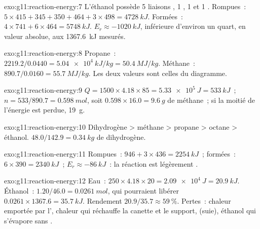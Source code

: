 \begin{solution}{exo:g11:reaction-energy:7}
L'éthanol  possède 5 liaisons , 1 ,
1  et 1 . Rompues~: $5 \times 415 + 345 + 350 + 464 + 3 \times 498 =
\qty{4728}{kJ}$. Formées~: $4 \times 741 + 6 \times 464 = \qty{5748}{kJ}$.
$E_r \approx \qty{-1020}{kJ}$, inférieure d'environ un quart, en valeur
absolue, aux \qty{1367.6}{kJ} mesurés.
\end{solution}

\begin{solution}{exo:g11:reaction-energy:8}
Propane~: $2219.2 / 0.0440 = \qty{5.04e4}{kJ/kg} = \qty{50.4}{MJ/kg}$.
Méthane~: $890.7 / 0.0160 = \qty{55.7}{MJ/kg}$. Les deux valeurs sont
celles du diagramme.
\end{solution}

\begin{solution}{exo:g11:reaction-energy:9}
$Q = 1500 \times 4.18 \times 85 = \qty{5.33e5}{J} = \qty{533}{kJ}$~;
$n = 533 / 890.7 = \qty{0.598}{mol}$, soit $0.598 \times 16.0 =
\qty{9.6}{g}$ de méthane~; si la moitié de l'énergie est perdue,
\qty{19}{g}.
\end{solution}

\begin{solution}{exo:g11:reaction-energy:10}
Dihydrogène > méthane > propane > octane > éthanol.
$48.0 / 142.9 = \qty{0.34}{kg}$ de dihydrogène.
\end{solution}

\begin{solution}{exo:g11:reaction-energy:11}
Rompues~: $946 + 3 \times 436 = \qty{2254}{kJ}$~; formées~:
$6 \times 390 = \qty{2340}{kJ}$~; $E_r \approx \qty{-86}{kJ}$~: la
réaction est légèrement .
\end{solution}

\begin{solution}{exo:g11:reaction-energy:12}
Eau~: $250 \times 4.18 \times 20 = \qty{2.09e4}{J} = \qty{20.9}{kJ}$.
Éthanol~: $1.20 / 46.0 = \qty{0.0261}{mol}$, qui pourraient libérer
$0.0261 \times 1367.6 = \qty{35.7}{kJ}$. Rendement
$20.9 / 35.7 \approx \qty{59}{\percent}$. Pertes~: chaleur emportée par
l', chaleur qui réchauffe la canette et le support,  (suie), éthanol qui s'évapore sans .
\end{solution}

